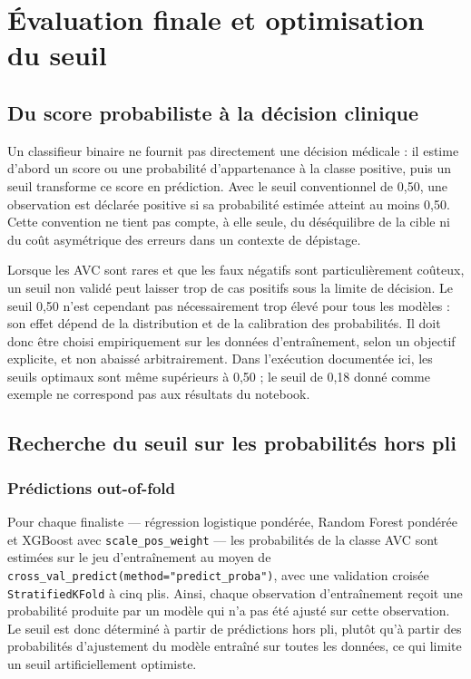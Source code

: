 \chapter{Évaluation finale et optimisation du seuil}
\label{chap:evaluation}
\thispagestyle{plain}

\section{Du score probabiliste à la décision clinique}
Un classifieur binaire ne fournit pas directement une décision médicale : il estime d'abord un score ou une probabilité d'appartenance à la classe positive, puis un seuil transforme ce score en prédiction. Avec le seuil conventionnel de 0,50, une observation est déclarée positive si sa probabilité estimée atteint au moins 0,50. Cette convention ne tient pas compte, à elle seule, du déséquilibre de la cible ni du coût asymétrique des erreurs dans un contexte de dépistage.

Lorsque les AVC sont rares et que les faux négatifs sont particulièrement coûteux, un seuil non validé peut laisser trop de cas positifs sous la limite de décision. Le seuil 0,50 n'est cependant pas nécessairement trop élevé pour tous les modèles : son effet dépend de la distribution et de la calibration des probabilités. Il doit donc être choisi empiriquement sur les données d'entraînement, selon un objectif explicite, et non abaissé arbitrairement. Dans l'exécution documentée ici, les seuils optimaux sont même supérieurs à 0,50 ; le seuil de 0,18 donné comme exemple ne correspond pas aux résultats du notebook.

\section{Recherche du seuil sur les probabilités hors pli}
\subsection{Prédictions out-of-fold}
Pour chaque finaliste — régression logistique pondérée, Random Forest pondérée et XGBoost avec \texttt{scale\_pos\_weight} — les probabilités de la classe AVC sont estimées sur le jeu d'entraînement au moyen de \texttt{cross\_val\_predict(method="predict\_proba")}, avec une validation croisée \texttt{StratifiedKFold} à cinq plis. Ainsi, chaque observation d'entraînement reçoit une probabilité produite par un modèle qui n'a pas été ajusté sur cette observation. Le seuil est donc déterminé à partir de prédictions hors pli, plutôt qu'à partir des probabilités d'ajustement du modèle entraîné sur toutes les données, ce qui limite un seuil artificiellement optimiste.

